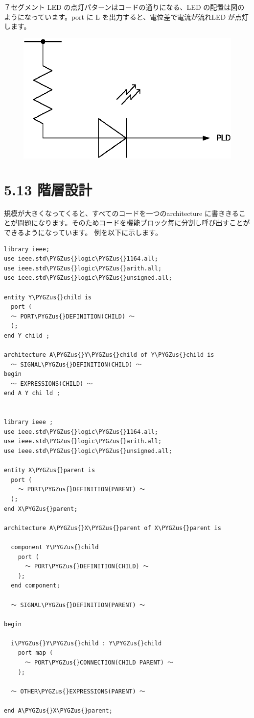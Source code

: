 \documentclass[letterpaper,10pt,dvipdfmx]{sphinxmanual}
\def\PYGZus{\char`\_}
\begin{document}
７セグメント LED の点灯パターンはコードの通りになる、LED の配置は図のようになっています。port に L を出力すると、電位差で電流が流れLED が点灯します。
\begin{figure}[htbp]
\centering

\includegraphics{figure26.eps}
\end{figure}


\section{5.13 階層設計}
\label{05_try:id22}
規模が大きくなってくると、すべてのコードを一つのarchitecture に書ききることが問題になります。そのためコードを機能ブロック毎に分割し呼び出すことができるようになっています。
例を以下に示します。

\begin{Verbatim}[commandchars=\\\{\}]
library ieee;
use ieee.std\PYGZus{}logic\PYGZus{}1164.all;
use ieee.std\PYGZus{}logic\PYGZus{}arith.all;
use ieee.std\PYGZus{}logic\PYGZus{}unsigned.all;

entity Y\PYGZus{}child is
  port (
  ～ PORT\PYGZus{}DEFINITION(CHILD) ～
  );
end Y child ;

architecture A\PYGZus{}Y\PYGZus{}child of Y\PYGZus{}child is
  ～ SIGNAL\PYGZus{}DEFINITION(CHILD) ～
begin
  ～ EXPRESSIONS(CHILD) ～
end A Y chi ld ;


library ieee ;
use ieee.std\PYGZus{}logic\PYGZus{}1164.all;
use ieee.std\PYGZus{}logic\PYGZus{}arith.all;
use ieee.std\PYGZus{}logic\PYGZus{}unsigned.all;

entity X\PYGZus{}parent is
  port (
    ～ PORT\PYGZus{}DEFINITION(PARENT) ～
  );
end X\PYGZus{}parent;

architecture A\PYGZus{}X\PYGZus{}parent of X\PYGZus{}parent is

  component Y\PYGZus{}child
    port (
      ～ PORT\PYGZus{}DEFINITION(CHILD) ～
    );
  end component;

  ～ SIGNAL\PYGZus{}DEFINITION(PARENT) ～

begin

  i\PYGZus{}Y\PYGZus{}child : Y\PYGZus{}child
    port map (
      ～ PORT\PYGZus{}CONNECTION(CHILD PARENT) ～
    );

  ～ OTHER\PYGZus{}EXPRESSIONS(PARENT) ～

end A\PYGZus{}X\PYGZus{}parent;
\end{Verbatim}
\end{document}
